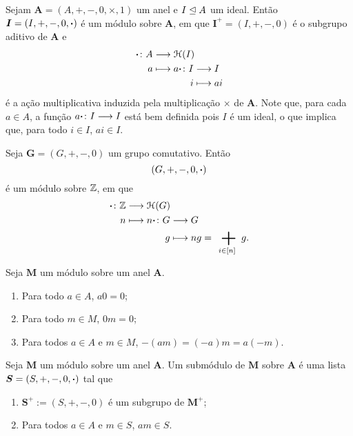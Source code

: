 \begin{example}
Sejam $\bm A=(A,+,-,0,\times,1)$ um anel e $I \mathrel{\unlhd} A$ um ideal. Então $\bm I = (I,+,-,0,\bm{\cdot})$ é um módulo sobre $\bm A$, em que $\bm I^+ = (I,+,-,0)$ é o subgrupo aditivo de $\bm A$ e
	\begin{align*}
	\func{\pt}{A}{\Homo(I)}{a}{
		\begin{aligned}[t]
			\func{a \pt}{I}{I}{i}{ai}
		\end{aligned}
	}
	\end{align*}
é a ação multiplicativa induzida pela multiplicação $\times$ de $\bm A$. Note que, para cada $a \in A$, a função ${a \bm{\cdot}}\colon {I} \longrightarrow {I}$ está bem definida pois $I$ é um ideal, o que implica que, para todo $i \in I$, $ai \in I$.
\end{example}

\begin{example}
Seja $\bm G=(G,+,-,0)$ um grupo comutativo. Então
	\begin{equation*}
	(G,+,-,0,\bm{\cdot})
	\end{equation*}
é um módulo sobre $\mathbb{Z}$, em que
	\begin{align*}
	\func{\pt}{\Z}{\Homo(G)}{n}{
		\begin{aligned}[t]
			\func{n \pt}{G}{G}{g}{ng=\sum_{i \in [n]} g}.
		\end{aligned}
	}
	\end{align*}
\end{example}

\begin{exercise}
Seja $\bm M$ um módulo sobre um anel $\bm A$.
	\begin{enumerate}
	\item Para todo $a \in A$, $a0=0$;
	\item Para todo $m \in M$, $0m=0$;
	\item Para todos $a \in A$ e $m \in M$, $-(am)=(-a)m=a(-m)$.
	\end{enumerate}
\end{exercise}

\begin{definition}
Seja $\bm M$ um módulo sobre um anel $\bm A$. Um submódulo de $\bm M$ sobre $\bm A$ é uma lista $\bm S = (S,+,-,0,\bm{\cdot})$ tal que
	\begin{enumerate}
	\item $\bm S^+ := (S,+,-,0)$ é um subgrupo de $\bm M^+$;
	\item Para todos $a \in A$ e $m \in S$, $am \in S$.
	\end{enumerate}
\end{definition}

